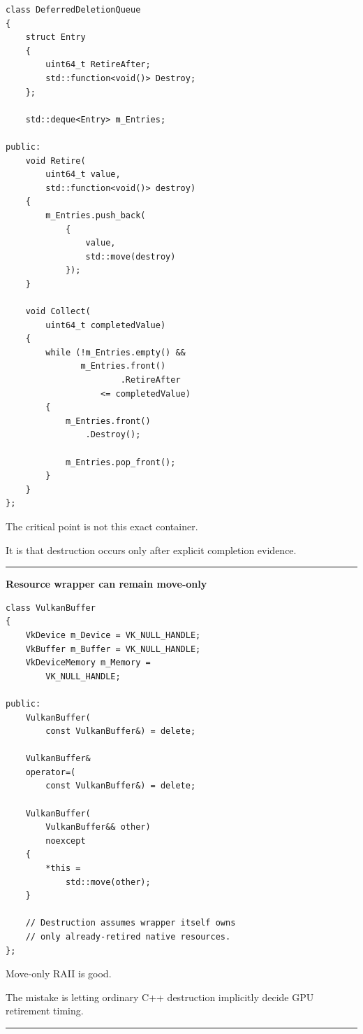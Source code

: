\begin{verbatim}
class DeferredDeletionQueue
{
    struct Entry
    {
        uint64_t RetireAfter;
        std::function<void()> Destroy;
    };

    std::deque<Entry> m_Entries;

public:
    void Retire(
        uint64_t value,
        std::function<void()> destroy)
    {
        m_Entries.push_back(
            {
                value,
                std::move(destroy)
            });
    }

    void Collect(
        uint64_t completedValue)
    {
        while (!m_Entries.empty() &&
               m_Entries.front()
                       .RetireAfter
                   <= completedValue)
        {
            m_Entries.front()
                .Destroy();

            m_Entries.pop_front();
        }
    }
};
\end{verbatim}

The critical point is not this exact container.

It is that destruction occurs only after explicit completion evidence.

\begin{center}\rule{0.5\linewidth}{0.5pt}\end{center}

\textbf{Resource wrapper can remain move-only}

\begin{verbatim}
class VulkanBuffer
{
    VkDevice m_Device = VK_NULL_HANDLE;
    VkBuffer m_Buffer = VK_NULL_HANDLE;
    VkDeviceMemory m_Memory =
        VK_NULL_HANDLE;

public:
    VulkanBuffer(
        const VulkanBuffer&) = delete;

    VulkanBuffer&
    operator=(
        const VulkanBuffer&) = delete;

    VulkanBuffer(
        VulkanBuffer&& other)
        noexcept
    {
        *this =
            std::move(other);
    }

    // Destruction assumes wrapper itself owns
    // only already-retired native resources.
};
\end{verbatim}

Move-only RAII is good.

The mistake is letting ordinary C++ destruction implicitly decide GPU retirement timing.

\begin{center}\rule{0.5\linewidth}{0.5pt}\end{center}

